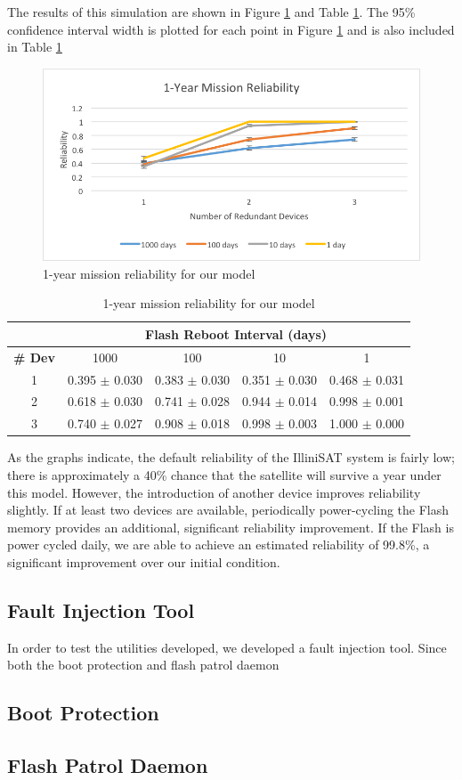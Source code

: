 The results of this simulation are shown in Figure \ref{fig:reliability} and Table \ref{tab:reliability}.  The 95\% confidence interval width is plotted for each point in Figure \ref{fig:reliability} and is also included in Table \ref{tab:reliability}

\begin{figure}[width = 0.5\textwidth]
\centering
\includegraphics[scale=0.6]{reliability}
\caption{1-year mission reliability for our model}\label{fig:reliability}
\end{figure}

\begin{table}[width = 0.5\textwidth]
\centering
\begin{tabular}{|c|c|c|c|c|}
\hline
& \multicolumn{4}{|c|}{\bf Flash Reboot Interval (days)}\\
\hline
{\bf \# Dev} & 1000 & 100 & 10 & 1\\
\hline
1 & 0.395 $\pm$ 0.030 & 0.383 $\pm$ 0.030 & 0.351 $\pm$ 0.030 & 0.468 $\pm$ 0.031 \\
2 & 0.618 $\pm$ 0.030 & 0.741 $\pm$ 0.028 & 0.944 $\pm$ 0.014 & 0.998 $\pm$ 0.001 \\
3 & 0.740 $\pm$ 0.027 & 0.908 $\pm$ 0.018 & 0.998 $\pm$ 0.003 & 1.000 $\pm$ 0.000 \\
\hline
\end{tabular}
\caption{1-year mission reliability for our model}\label{tab:reliability}
\end{table}

As the graphs indicate, the default reliability of the IlliniSAT system is fairly low; there is approximately a 40\% chance that the satellite will survive a year under this model.  However, the introduction of another device improves reliability slightly.  If at least two devices are available, periodically power-cycling the Flash memory provides an additional, significant reliability improvement.  If the Flash is power cycled daily, we are able to achieve an estimated reliability of 99.8\%, a significant improvement over our initial condition.

\subsection{Fault Injection Tool}

In order to test the utilities developed, we developed a fault injection tool.
Since both the boot protection and flash patrol daemon 

\subsection{Boot Protection}

\subsection{Flash Patrol Daemon}
